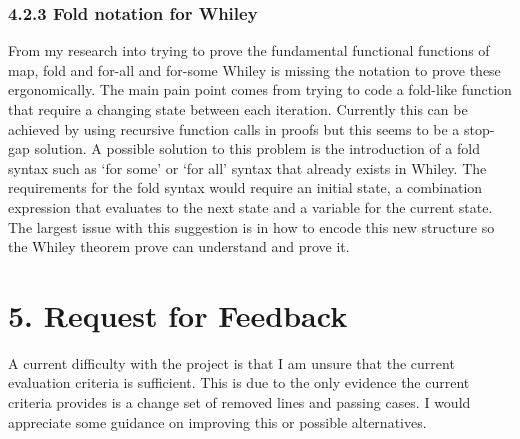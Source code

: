 \documentclass[11pt, a4paper, twoside, openright]{report}
\begin{document}
\subsubsection*{4.2.3 Fold notation for Whiley}
From my research into trying to prove the fundamental functional functions of
map, fold and for-all and for-some Whiley is missing the notation to prove
these ergonomically. The main pain point comes from trying to code a fold-like
function that require a changing state between each iteration. Currently this
can be achieved by using recursive function calls in proofs but this seems to
be a stop-gap solution. A possible solution to this problem is the 
introduction of a fold syntax such as `for some' or `for all' syntax that
already exists in Whiley. The requirements for the fold syntax would require
an initial state, a combination expression that evaluates to the next state
and a variable for the current state.
The largest issue with this suggestion is in how to encode this new structure
so the Whiley theorem prove can understand and prove it.

\section*{5. Request for Feedback}


A current difficulty with the project is that I am unsure that the current
evaluation criteria is sufficient.
This is due to the only evidence the current criteria provides is a change set
of removed lines and passing cases. I would appreciate some guidance on
improving this or possible alternatives.



\backmatter{}

%



\appendix
% 
\end{document}
